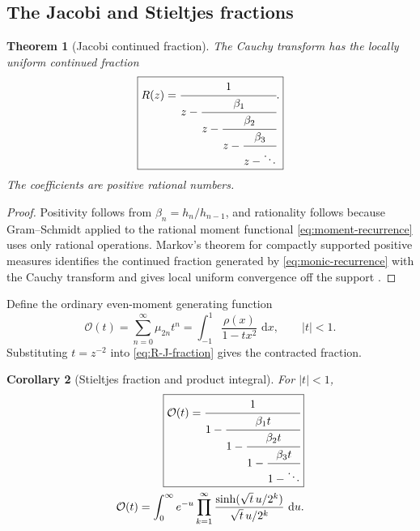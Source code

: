 \documentclass[11pt]{article}
\newtheorem{theorem}{Theorem}[section]
\newtheorem{corollary}[theorem]{Corollary}
\theoremstyle{definition}
\theoremstyle{remark}
\newcommand{\dd}{\,\mathrm d}
\newcommand{\cO}{\mathcal O}
\begin{document}
\subsection{The Jacobi and Stieltjes fractions}

\begin{theorem}[Jacobi continued fraction]\label{thm:J-fraction}
The Cauchy transform has the locally uniform continued fraction
\begin{equation}
 \boxed{
 R(z)=\cfrac{1}{z-\cfrac{\beta_1}{z-\cfrac{\beta_2}{z-
           \cfrac{\beta_3}{z-\ddots}}}}.
 }                                                           \label{eq:R-J-fraction}
\end{equation}
The coefficients are positive rational numbers.
\end{theorem}

\begin{proof}
Positivity follows from \(\beta_n=h_n/h_{n-1}\), and rationality follows because
Gram--Schmidt applied to the rational moment functional \eqref{eq:moment-recurrence}
uses only rational operations.  Markov's theorem for compactly supported positive measures
identifies the continued fraction generated by \eqref{eq:monic-recurrence} with the Cauchy
transform and gives local uniform convergence off the support \cite{VanAssche1993,SimonOPRL}.
\end{proof}

Define the ordinary even-moment generating function
\begin{equation}
 \cO(t)=\sum_{n=0}^{\infty}\mu_{2n}t^n
 =\int_{-1}^{1}\frac{\rho(x)}{1-tx^2}\,\dd x,
 \qquad |t|<1.                                               \label{eq:O-def}
\end{equation}
Substituting \(t=z^{-2}\) into \eqref{eq:R-J-fraction} gives the contracted fraction.

\begin{corollary}[Stieltjes fraction and product integral]\label{cor:S-fraction}
For \(|t|<1\),
\begin{align}
 \boxed{
 \cO(t)=\cfrac{1}{1-\cfrac{\beta_1t}{1-\cfrac{\beta_2t}{1-
               \cfrac{\beta_3t}{1-\ddots}}}}
 }                                                           \label{eq:O-S-fraction}\\
 \cO(t)=\int_0^{\infty}e^{-u}
 \prod_{k=1}^{\infty}
 \frac{\sinh(\sqrt t\,u/2^k)}{\sqrt t\,u/2^k}\,\dd u.    \label{eq:O-product-integral}
\end{align}
\end{corollary}
\end{document}
